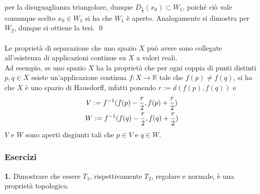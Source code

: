 \documentclass{article}
\begin{document}
per la disuguaglianza triangolare, dunque $D_{\frac{r}{3}}(x_0) \subset W_1$, poiché ciò vale comunque scelto $x_0 \in W_1$ si ha che $W_1$ è aperto. Analogamente si dimostra per $W_2$, dunque si ottiene la tesi. \qed \\ \\
Le proprietà di separazione che uno spazio $X$ può avere sono collegate all'esistenza di applicazioni continue su $X$ a valori reali. \\
Ad esempio, se uno spazio $X$ ha la proprietà che per ogni coppia di punti distinti $p, q \in X$ esiste un'applicazione continua $f : X \longrightarrow \mathbb{R}$ tale che $f(p) \neq f(q)$, si ha che $X$ è uno spazio di Hausdorff, infatti ponendo $r := d(f(p), f(q))$ e
\begin{gather}
    V := f^{-1}(f(p) - \frac{r}{2}, f(p) + \frac{r}{2}) \notag \\
    W := f^{-1}(f(q) - \frac{r}{2}, f(q) + \frac{r}{2}) \notag
\end{gather}
$V$ e $W$ sono aperti disgiunti tali che $p \in V$ e $q \in W$.
\subsubsection{Esercizi}
\textbf{1.} Dimostrare che essere $T_1$, rispettivamente $T_2$, regolare e normale, è una proprietà topologica. \\
\end{document}
